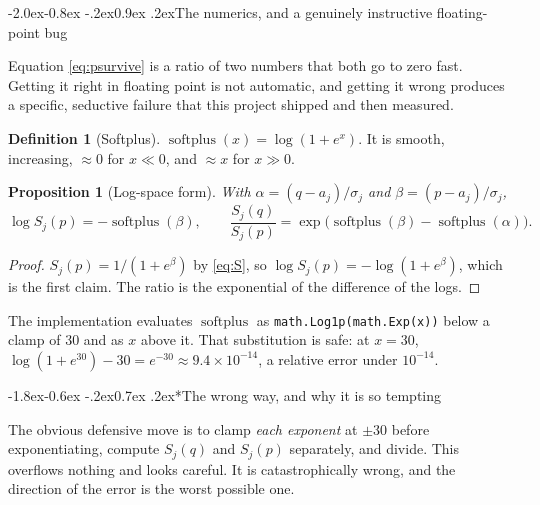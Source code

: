 \documentclass[10pt,a4paper]{article}
\makeatletter
\theoremstyle{plain}
\newtheorem{proposition}[theorem]{Proposition}
\theoremstyle{definition}
\newtheorem{definition}[theorem]{Definition}
\theoremstyle{remark}
\newcommand{\code}[1]{\texttt{\small #1}}
\renewcommand\subsection{\@startsection{subsection}{2}{\z@}%
  {-2.0ex\@plus -0.8ex \@minus -.2ex}{0.9ex \@plus .2ex}{\normalfont\large\bfseries}}
\renewcommand\subsubsection{\@startsection{subsubsection}{3}{\z@}%
  {-1.8ex\@plus -0.6ex \@minus -.2ex}{0.7ex \@plus .2ex}{\normalfont\normalsize\bfseries}}
\makeatother
\begin{document}
\subsection{The numerics, and a genuinely instructive floating-point bug}
\label{sec:logspace}

Equation \eqref{eq:psurvive} is a ratio of two numbers that both go to zero fast. Getting
it right in floating point is not automatic, and getting it wrong produces a specific,
seductive failure that this project shipped and then measured.

\begin{definition}[Softplus]
$\operatorname{softplus}(x) = \log(1 + e^x)$. It is smooth, increasing,
$\approx 0$ for $x \ll 0$, and $\approx x$ for $x \gg 0$.
\end{definition}

\begin{proposition}[Log-space form]
\label{prop:logspace}
With $\alpha = (q - a_j)/\sigma_j$ and $\beta = (p - a_j)/\sigma_j$,
\begin{equation}
\log S_j(p) = -\operatorname{softplus}(\beta),
\qquad
\frac{S_j(q)}{S_j(p)} = \exp\!\big(\operatorname{softplus}(\beta) - \operatorname{softplus}(\alpha)\big).
\label{eq:logspaceratio}
\end{equation}
\end{proposition}

\begin{proof}
$S_j(p) = 1/(1+e^{\beta})$ by \eqref{eq:S}, so $\log S_j(p) = -\log(1+e^{\beta})$, which
is the first claim. The ratio is the exponential of the difference of the logs.
\end{proof}

The implementation evaluates $\operatorname{softplus}$ as \code{math.Log1p(math.Exp(x))}
below a clamp of $30$ and as $x$ above it. That substitution is safe: at $x = 30$,
$\log(1+e^{30}) - 30 = e^{-30} \approx 9.4\times10^{-14}$, a relative error under
$10^{-14}$.

\subsubsection*{The wrong way, and why it is so tempting}

The obvious defensive move is to clamp \emph{each exponent} at $\pm 30$ before
exponentiating, compute $S_j(q)$ and $S_j(p)$ separately, and divide. This overflows
nothing and looks careful. It is catastrophically wrong, and the direction of the error
is the worst possible one.
\end{document}
